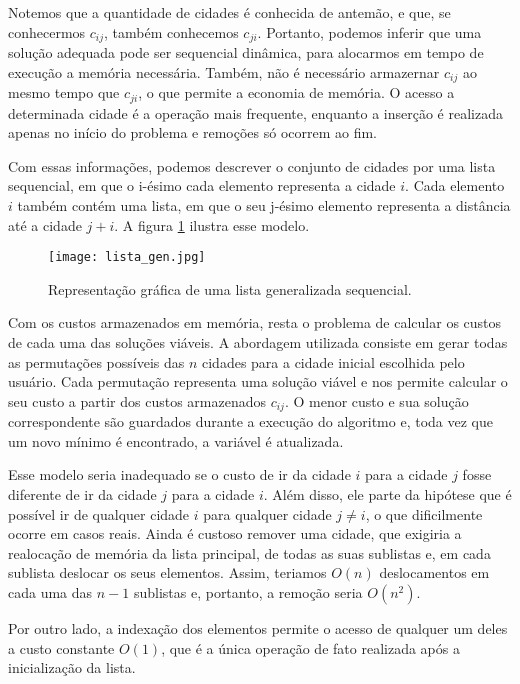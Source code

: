 \documentclass[a4paper, 12pt]{article} %
\begin{document}
	Notemos que a quantidade de cidades é conhecida de antemão, e que, se conhecermos $c_{ij}$, também conhecemos $c_{ji}$. Portanto, podemos inferir que uma solução adequada pode ser sequencial dinâmica, para alocarmos em tempo de execução a memória necessária. Também, não é necessário armazernar $c_{ij}$ ao mesmo tempo que $c_{ji}$, o que permite a economia de memória. O acesso a determinada cidade é a operação mais frequente, enquanto a inserção é realizada apenas no início do problema e remoções só ocorrem ao fim.
	
	Com essas informações, podemos descrever o conjunto de cidades por uma lista sequencial, em que o i-ésimo cada elemento representa a cidade $i$. Cada elemento $i$ também contém uma lista, em que o seu j-ésimo elemento representa a distância até a cidade $j + i$. A figura \ref{lista_gen} ilustra esse modelo.
	
	\begin{figure}[!h]
		\centering
		\texttt{[image: lista\_gen.jpg]}
		\caption{Representação gráfica de uma lista generalizada sequencial.}
		\label{lista_gen}
	\end{figure}
	
	Com os custos armazenados em memória, resta o problema de calcular os custos de cada uma das soluções viáveis. A abordagem utilizada consiste em gerar todas as permutações possíveis das $n$ cidades para a cidade inicial escolhida pelo usuário. Cada permutação representa uma solução viável e nos permite calcular o seu custo a partir dos custos armazenados $c_{ij}$. O menor custo e sua solução correspondente são guardados durante a execução do algoritmo e, toda vez que um novo mínimo é encontrado, a variável é atualizada.
	
	Esse modelo seria inadequado se o custo de ir da cidade $i$ para a cidade $j$ fosse diferente de ir da cidade $j$ para a cidade $i$. Além disso, ele parte da hipótese que é possível ir de qualquer cidade $i$ para qualquer cidade $j \neq i$, o que dificilmente ocorre em casos reais. Ainda é custoso remover uma cidade, que exigiria a realocação de memória da lista principal, de todas as suas sublistas e, em cada sublista deslocar os seus elementos. Assim, teriamos $O(n)$ deslocamentos em cada uma das $n - 1$ sublistas e, portanto, a remoção seria $O(n^2)$.
	
	Por outro lado, a indexação dos elementos permite o acesso de qualquer um deles a custo constante $O(1)$, que é a única operação de fato realizada após a inicialização da lista. 
\end{document}
